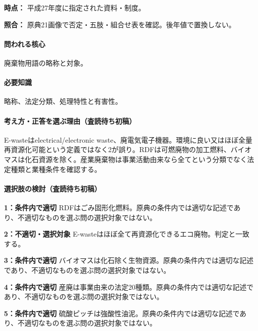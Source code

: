 \noindent\textbf{時点：} 平成27年度に指定された資料・制度。\par

\noindent\textbf{照合：} 原典21画像で否定・五肢・組合せ表を確認。後年値で置換しない。\par

\paragraph{問われる核心} 廃棄物用語の略称と対象。

\paragraph{必要知識} 略称、法定分類、処理特性と有害性。

\paragraph{考え方・正答を選ぶ理由（査読待ち初稿）} E-wasteはelectrical/electronic waste、廃電気電子機器。環境に良い又はほぼ全量再資源化可能という定義ではなく2が誤り。RDFは可燃廃物の加工燃料、バイオマスは化石資源を除く。産業廃棄物は事業活動由来なら全てという分類でなく法定種類と業種条件を確認する。

\paragraph{選択肢の検討（査読待ち初稿）}\mbox{}\par

\noindent\textbf{1：条件内で適切} RDFはごみ固形化燃料。原典の条件内では適切な記述であり、不適切なものを選ぶ問の選択対象ではない。\par

\noindent\textbf{2：不適切・選択対象} E-wasteはほぼ全て再資源化できるエコ廃物。判定と一致する。\par

\noindent\textbf{3：条件内で適切} バイオマスは化石除く生物資源。原典の条件内では適切な記述であり、不適切なものを選ぶ問の選択対象ではない。\par

\noindent\textbf{4：条件内で適切} 産廃は事業由来の法定20種類。原典の条件内では適切な記述であり、不適切なものを選ぶ問の選択対象ではない。\par

\noindent\textbf{5：条件内で適切} 硫酸ピッチは強酸性油泥。原典の条件内では適切な記述であり、不適切なものを選ぶ問の選択対象ではない。\par

